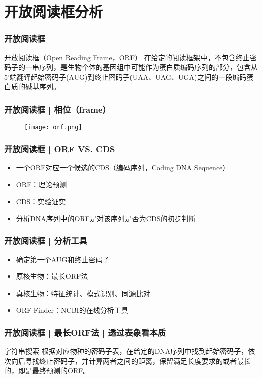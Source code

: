\section{开放阅读框分析}
\begin{frame}
  \frametitle{开放阅读框}
  \begin{block}{开放阅读框（Open Reading Frame，ORF）}
    在给定的阅读框架中，不包含终止密码子的一串序列，是生物个体的基因组中可能作为蛋白质编码序列的部分，包含从5'端翻译起始密码子(AUG)到终止密码子(UAA、UAG、UGA)之间的一段编码蛋白质的碱基序列。
  \end{block}
\end{frame}

\begin{frame}
  \frametitle{开放阅读框 | 相位（frame）}
  \begin{figure}
    \centering
    \texttt{[image: orf.png]}
  \end{figure}
\end{frame}

\begin{frame}
  \frametitle{开放阅读框 | \alert{ORF VS. CDS}}
  \pause
  \begin{itemize}
    \item 一个ORF对应一个候选的CDS（编码序列，Coding DNA Sequence）
    \item ORF：理论预测
    \item CDS：实验证实
    \item 分析DNA序列中的ORF是对该序列是否为CDS的初步判断
  \end{itemize}
\end{frame}

\begin{frame}
  \frametitle{开放阅读框 | 分析工具}
  \begin{itemize}
    \item 确定第一个AUG和终止密码子
    \item 原核生物：最长ORF法
    \item 真核生物：特征统计、模式识别、同源比对
    \item ORF Finder：NCBI的在线分析工具
  \end{itemize}
\end{frame}

\begin{frame}
  \frametitle{开放阅读框 | 最长ORF法 | 透过表象看本质}
  \begin{block}{字符串搜索}
  根据对应物种的密码子表，在给定的DNA序列中找到起始密码子，依次向后寻找终止密码子，并计算两者之间的距离，保留满足长度要求的或者最长的，即是最终预测的ORF。
  \end{block}
\end{frame}

